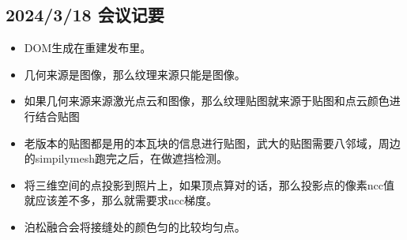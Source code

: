 \subsection{2024/3/18 会议记要}

\begin{itemize}
    \item DOM生成在重建发布里。
    \item 几何来源是图像，那么纹理来源只能是图像。
    \item 如果几何来源来源激光点云和图像，那么纹理贴图就来源于贴图和点云颜色进行结合贴图
    \item 老版本的贴图都是用的本瓦块的信息进行贴图，武大的贴图需要八邻域，周边的simpilymesh跑完之后，在做遮挡检测。
    \item 将三维空间的点投影到照片上，如果顶点算对的话，那么投影点的像素ncc值就应该差不多，那么就需要求ncc梯度。
    \item 泊松融合会将接缝处的颜色匀的比较均匀点。
\end{itemize}